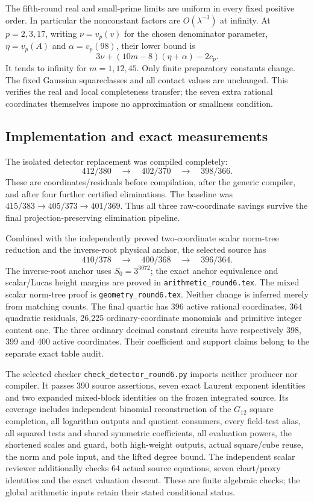 The fifth-round real and small-prime limits are uniform in every fixed
positive order. In particular the nonconstant factors are
$O(\lambda^{-3})$ at infinity. At $p=2,3,17$, writing
$\nu=v_p(v)$ for the chosen denominator parameter,
$\eta=v_p(A)$ and $\alpha=v_p(98)$, their lower bound is
\[
 3\nu+(10m-8)(\eta+\alpha)-2c_p.
\]
It tends to infinity for $m=1,12,45$. Only finite preparatory constants
change. The fixed Gaussian squareclasses and all contact values are
unchanged. This verifies the real and local completeness transfer;
the seven extra rational coordinates themselves impose no approximation
or smallness condition.

\subsection{Implementation and exact measurements}

The isolated detector replacement was compiled completely:
\[
 412/380\quad\longrightarrow\quad402/370
 \quad\longrightarrow\quad398/366.
\]
These are coordinates/residuals before compilation, after the generic
compiler, and after four further certified eliminations. The baseline
was $415/383\to405/373\to401/369$. Thus all three raw-coordinate savings
survive the final projection-preserving elimination pipeline.

Combined with the independently proved two-coordinate scalar norm-tree
reduction and the inverse-root physical anchor, the selected source has
\[
 410/378\quad\longrightarrow\quad400/368
 \quad\longrightarrow\quad\boxed{396/364}.
\]
The inverse-root anchor uses $S_0=3^{3072}$; the exact anchor equivalence
and scalar/Lucas height margins are proved in
\texttt{arithmetic\_round6.tex}. The mixed scalar norm-tree proof is
\texttt{geometry\_round6.tex}. Neither change is inferred merely from
matching counts. The final quartic has 396 active rational coordinates,
364 quadratic residuals, 26,225 ordinary-coordinate monomials and
primitive integer content one. The three ordinary decimal constant
circuits have respectively 398, 399 and 400 active coordinates. Their
coefficient and support claims belong to the separate exact table audit.

The selected checker \texttt{check\_detector\_round6.py} imports neither
producer nor compiler. It passes 390 source assertions, seven exact
Laurent exponent identities and two expanded mixed-block identities on
the frozen integrated source. Its coverage includes independent binomial
reconstruction of the $G_{12}$ square completion, all logarithm outputs
and quotient consumers, every field-test alias, all squared tests and
shared symmetric coefficients, all evaluation powers, the shortened
scales and guard, both high-weight outputs, actual square/cube reuse,
the norm and pole input, and the lifted degree bound. The independent
scalar reviewer additionally checks 64 actual source equations, seven
chart/proxy identities and the exact valuation descent. These are finite
algebraic checks; the global arithmetic inputs retain their stated
conditional status.

